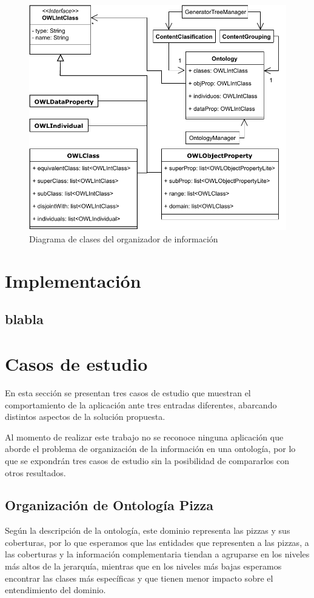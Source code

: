 \begin{figure}
    \centering
    \includegraphics{img/organizacion_informacion/clases_organizador_informacion.pdf}
    \caption{Diagrama de clases del organizador de información}
    \label{fig:diagrama_clases_organizador}
\end{figure}

\section{Implementación}
\subsection{blabla}

\section{Casos de estudio}
En esta sección se presentan tres casos de estudio que muestran el comportamiento de la aplicación ante tres entradas diferentes, abarcando distintos aspectos de la solución propuesta.

Al momento de realizar este trabajo no se reconoce ninguna aplicación que aborde el problema de organización de la información en una ontología, por lo que se expondrán tres casos de estudio sin la posibilidad de compararlos con otros resultados.

\subsection{Organización de Ontología Pizza}
Según la descripción de la ontología, este dominio representa las pizzas y sus coberturas, por lo que esperamos que las entidades que representen a las pizzas, a las coberturas y la información complementaria tiendan a agruparse en los niveles más altos de la jerarquía, mientras que en los niveles más bajas esperamos encontrar las clases más específicas y que tienen menor impacto sobre el entendimiento del dominio.

